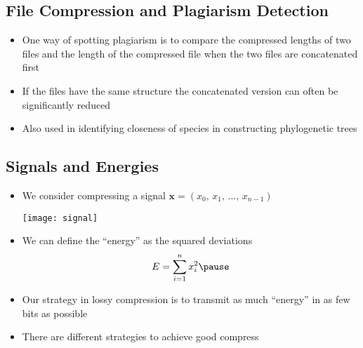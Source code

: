 \begin{slide}
\section{File Compression and Plagiarism Detection}

\begin{PauseHighLight}
  \begin{itemize}
  \item One way of spotting plagiarism is to compare the compressed
    lengths of two files and the length of the compressed file when the
    two files are concatenated first\pause
  \item If the files have the same structure the concatenated version
    can often be significantly reduced\pause
  \item Also used in identifying closeness of species in constructing
    phylogenetic trees\pause
  \end{itemize}
\end{PauseHighLight}

\end{slide}


\Outline %

\begin{slide}
\section[-1]{Signals and Energies}

\begin{PauseHighLight}
  \begin{itemize}
  \item We consider compressing a signal $\bm{x} = (x_0,\,x_1,\,
    \ldots,\, x_{n-1})$\pause
    \begin{center}
      \texttt{[image: signal]}
    \end{center}
  \item We can define the ``energy'' as the squared deviations
    \begin{align*}
      E = \sum_{i=1}^n x_i^2\pause
    \end{align*}
  \item Our strategy in lossy compression is to transmit as much
    ``energy'' in as few bits as possible\pause
  \item There are different strategies to achieve good compress\pause
  \end{itemize}
\end{PauseHighLight}
\end{slide}

